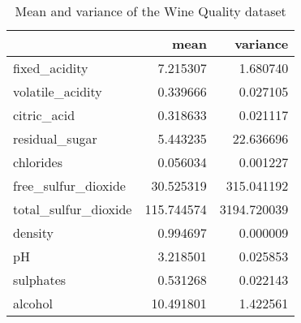 \begin{table}[!h]
    \begin{center}
        \begin{tabular}{lrr}
            \toprule
            {} &           mean & variance \\
            \midrule
            fixed\_acidity         &    7.215307  &     1.680740 \\
            volatile\_acidity      &    0.339666  &     0.027105 \\
            citric\_acid           &    0.318633  &     0.021117 \\
            residual\_sugar        &    5.443235  &    22.636696 \\
            chlorides              &    0.056034  &     0.001227 \\
            free\_sulfur\_dioxide  &   30.525319  &   315.041192 \\
            total\_sulfur\_dioxide &  115.744574  &  3194.720039 \\
            density                &    0.994697  &     0.000009 \\
            pH                     &    3.218501  &     0.025853 \\
            sulphates              &    0.531268  &     0.022143 \\
            alcohol                &   10.491801  &     1.422561 \\
            \bottomrule
        \end{tabular}
        \caption{Mean and variance of the Wine Quality dataset}
    \end{center}
\end{table}

